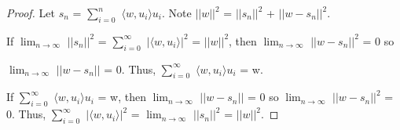     \begin{proof}
        Let $s_n$ = $\sum_{i=0}^{n}$ $\langle w , u_i \rangle u_i$.
        Note $||w||^2$ = $||s_n||^2$ + $||w-s_n||^2$.

        If $\lim_{n \rightarrow \infty}$ $||s_n||^2$
        = $\sum_{i=0}^{\infty}$ $|\langle w , u_i \rangle|^2$ = $||w||^2$,
        then $\lim_{n \rightarrow \infty}$ $||w-s_n||^2$ = 0 so
        
        $\lim_{n \rightarrow \infty}$ $||w-s_n||$ = 0.
        Thus, $\sum_{i=0}^{\infty}$ $\langle w , u_i \rangle u_i$ = w.

        If $\sum_{i=0}^{\infty}$ $\langle w , u_i \rangle u_i$ = w,
        then $\lim_{n \rightarrow \infty}$ $||w-s_n||$ = 0
        so $\lim_{n \rightarrow \infty}$ $||w-s_n||^2$ = 0.
        Thus, $\sum_{i=0}^{\infty}$ $|\langle w , u_i \rangle|^2$
        = $\lim_{n \rightarrow \infty}$ $||s_n||^2$ = $||w||^2$.
    \end{proof}





































